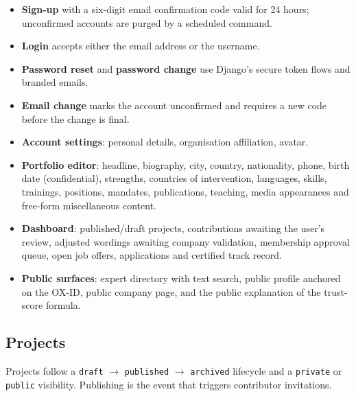 \documentclass[11pt,a4paper]{article}
\begin{document}
\begin{itemize}[leftmargin=1.4em,itemsep=3pt]
  \item \textbf{Sign-up} with a six-digit email confirmation code valid for
        24 hours; unconfirmed accounts are purged by a scheduled command.
  \item \textbf{Login} accepts either the email address or the username.
  \item \textbf{Password reset} and \textbf{password change} use Django's
        secure token flows and branded emails.
  \item \textbf{Email change} marks the account unconfirmed and requires a new
        code before the change is final.
  \item \textbf{Account settings}: personal details, organisation affiliation,
        avatar.
  \item \textbf{Portfolio editor}: headline, biography, city, country,
        nationality, phone, birth date (confidential), strengths, countries of
        intervention, languages, skills, trainings, positions, mandates,
        publications, teaching, media appearances and free-form miscellaneous
        content.
  \item \textbf{Dashboard}: published/draft projects, contributions awaiting the
        user's review, adjusted wordings awaiting company validation,
        membership approval queue, open job offers, applications and certified
        track record.
  \item \textbf{Public surfaces}: expert directory with text search, public
        profile anchored on the OX-ID, public company page, and the public
        explanation of the trust-score formula.
\end{itemize}

\subsection{Projects}

Projects follow a \texttt{draft} $\rightarrow$ \texttt{published}
$\rightarrow$ \texttt{archived} lifecycle and a \texttt{private} or
\texttt{public} visibility. Publishing is the event that triggers contributor
invitations.
\end{document}
